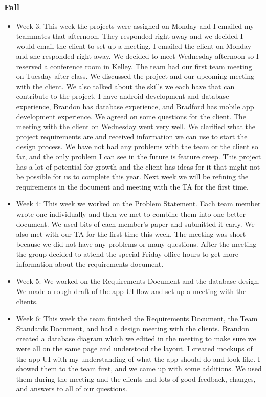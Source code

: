 \documentclass[onecolumn, draftclsnofoot,10pt, compsoc]{IEEEtran}
\begin{document}
 \subsubsection{Fall}
 \begin{itemize}
     \item Week 3: This week the projects were assigned on Monday and I emailed my teammates that afternoon. They responded right away and we decided I would email the client to set up a meeting. I emailed the client on Monday and she responded right away. We decided to meet Wednesday afternoon so I reserved a conference room in Kelley. 
The team had our first team meeting on Tuesday after class. We discussed the project and our upcoming meeting with the client. We also talked about the skills we each have that can contribute to the project. I have android development and database experience, Brandon has database experience, and Bradford has mobile app development experience. We agreed on some questions for the client. The meeting with the client on Wednesday went very well. We clarified what the project requirements are and received information we can use to start the design process. 
We have not had any problems with the team or the client so far, and the only problem I can see in the future is feature creep. This project has a lot of potential for growth and the client has ideas for it that might not be possible for us to complete this year. Next week we will be refining the requirements in the document and meeting with the TA for the first time. 
\item Week 4: This week we worked on the Problem Statement. Each team member wrote one individually and then we met to combine them into one better document. We used bits of each member’s paper and submitted it early. 
We also met with our TA for the first time this week. The meeting was short because we did not have any problems or many questions. After the meeting the group decided to attend the special Friday office hours to get more information about the requirements document.
\item Week 5: We worked on the Requirements Document and the database design. We made a rough draft of the app UI flow and set up a meeting with the clients. 
\item Week 6: This week the team finished the Requirements Document, the Team Standards Document, and had a design meeting with the clients. Brandon created a database diagram which we edited in the meeting to make sure we were all on the same page and understood the layout. I created mockups of the app UI with my understanding of what the app should do and look like. I showed them to the team first, and we came up with some additions. We used them during the meeting and the clients had lots of good feedback, changes, and answers to all of our questions. 

\end{itemize}
\end{document}
